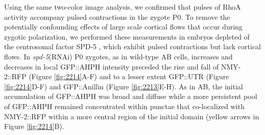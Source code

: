 Using the same two-color image analysis, we confirmed that pulses of RhoA activity accompany pulsed contractions in the zygote P0. To remove the potentially confounding effects of large scale cortical flows that occur during zygotic polarization, we performed these measurements in embryos depleted of the centrosomal factor SPD-5  \cite{Munro:2004jk, Hamill:2002tw}, which exhibit pulsed contractions but lack cortical flows. In \textit{spd-5}(RNAi) P0 zygotes, as in wild-type AB cells, increases and decreases in local GFP::AHPH intensity preceded the rise and fall of NMY-2::RFP (Figure \ref{fig:2214}A-F) and to a lesser extent GFP::UTR (Figure \ref{fig:2214}D-F) and GFP::Anillin (Figure \ref{fig:2213}E-H).  As in AB, the initial accumulation of GFP::AHPH was broad and diffuse while a more persistent pool of GFP::AHPH remained concentrated within punctae that co-localized with NMY-2::RFP within a more central region of the initial domain (yellow arrows in Figure \ref{fig:2214}B). 

